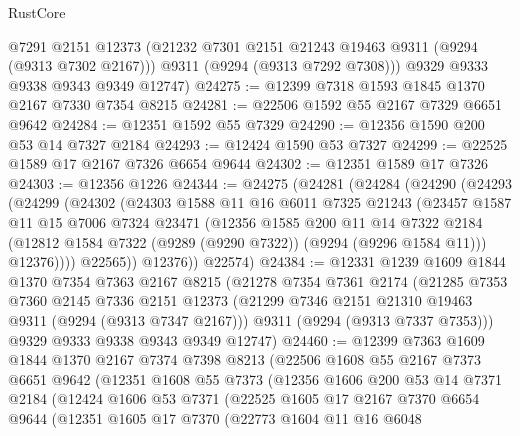\begin{lexlean}{RustCore}
\begin{coremodule}
        @7291
        @2151
        @12373
        (@21232 @7301 @2151 @21243 @19463 @9311 (@9294 (@9313 @7302 @2167)))
        @9311
        (@9294 (@9313 @7292 @7308)))
      @9329
      @9333
      @9338
      @9343
      @9349
      @12747)
@24275 := @12399 @7318 @1593 @1845 @1370 @2167 @7330 @7354 @8215
@24281 := @22506 @1592 @55 @2167 @7329 @6651 @9642
@24284 := @12351 @1592 @55 @7329
@24290 := @12356 @1590 @200 @53 @14 @7327 @2184
@24293 := @12424 @1590 @53 @7327
@24299 := @22525 @1589 @17 @2167 @7326 @6654 @9644
@24302 := @12351 @1589 @17 @7326
@24303 := @12356 @1226
@24344 := @24275
    (@24281
      (@24284
        (@24290
          (@24293
            (@24299
              (@24302
                (@24303
                  @1588
                  @11
                  @16
                  @6011
                  @7325
                  @21243
                  (@23457
                    @1587
                    @11
                    @15
                    @7006
                    @7324
                    @23471
                    (@12356
                      @1585
                      @200
                      @11
                      @14
                      @7322
                      @2184
                      (@12812 @1584 @7322 (@9289 (@9290 @7322)) (@9294 (@9296 @1584 @11)))
                      @12376))))
              @22565))
          @12376))
      @22574)
@24384 := @12331
    @1239
    @1609
    @1844
    @1370
    @7354
    @7363
    @2167
    @8215
    (@21278
      @7354
      @7361
      @2174
      (@21285
        @7353
        @7360
        @2145
        @7336
        @2151
        @12373
        (@21299 @7346 @2151 @21310 @19463 @9311 (@9294 (@9313 @7347 @2167)))
        @9311
        (@9294 (@9313 @7337 @7353)))
      @9329
      @9333
      @9338
      @9343
      @9349
      @12747)
@24460 := @12399
    @7363
    @1609
    @1844
    @1370
    @2167
    @7374
    @7398
    @8213
    (@22506
      @1608
      @55
      @2167
      @7373
      @6651
      @9642
      (@12351
        @1608
        @55
        @7373
        (@12356
          @1606
          @200
          @53
          @14
          @7371
          @2184
          (@12424
            @1606
            @53
            @7371
            (@22525
              @1605
              @17
              @2167
              @7370
              @6654
              @9644
              (@12351
                @1605
                @17
                @7370
                (@22773
                  @1604
                  @11
                  @16
                  @6048

\end{coremodule}
\end{lexlean}
